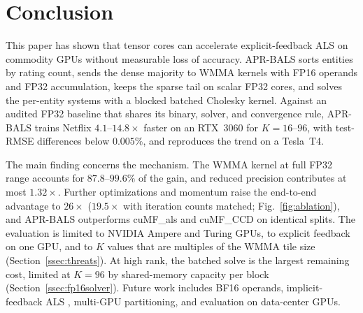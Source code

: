 \section{Conclusion}
\label{sec:conclusion}

This paper has shown that tensor cores can accelerate explicit-feedback ALS on commodity GPUs without measurable loss of accuracy. APR-BALS sorts entities by rating count, sends the dense majority to WMMA kernels with FP16 operands and FP32 accumulation, keeps the sparse tail on scalar FP32 cores, and solves the per-entity systems with a blocked batched Cholesky kernel. Against an audited FP32 baseline that shares its binary, solver, and convergence rule, APR-BALS trains Netflix $4.1$--$14.8\times$ faster on an RTX~3060 for $K=16$--$96$, with test-RMSE differences below $0.005\%$, and reproduces the trend on a Tesla~T4.

The main finding concerns the mechanism. The WMMA kernel at full FP32 range accounts for $87.8$--$99.6\%$ of the gain, and reduced precision contributes at most $1.32\times$. Further optimizations and momentum raise the end-to-end advantage to $26\times$ ($19.5\times$ with iteration counts matched; Fig.~\ref{fig:ablation}), and APR-BALS outperforms cuMF\_als and cuMF\_CCD on identical splits.
The evaluation is limited to NVIDIA Ampere and Turing GPUs, to explicit feedback on one GPU, and to $K$ values that are multiples of the WMMA tile size (Section~\ref{ssec:threats}). At high rank, the batched solve is the largest remaining cost, limited at $K=96$ by shared-memory capacity per block (Section~\ref{ssec:fp16solver}). Future work includes BF16 operands, implicit-feedback ALS \cite{hu2008collaborative}, multi-GPU partitioning, and evaluation on data-center GPUs.
